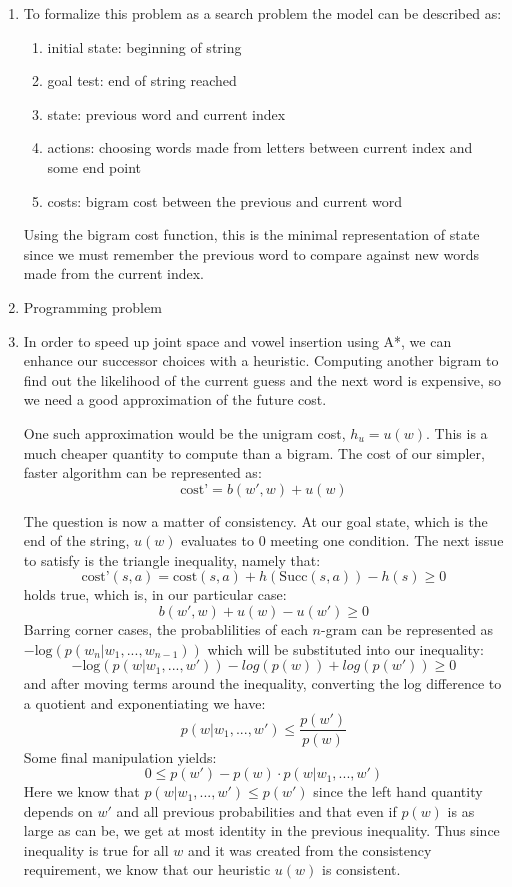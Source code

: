 \documentclass[12pt]{article}
\begin{document}
\begin{enumerate}[label=(\alph*)]
	\item To formalize this problem as a search problem the model can be
		described as:

		\begin{enumerate}
			\item initial state: beginning of string
			\item goal test: end of string reached
			\item state: previous word and current index
			\item actions: choosing words made from letters between current index and some
				end point
			\item costs: bigram cost between the previous and current word
		\end{enumerate}

		Using the bigram cost function, this is the minimal representation of state
		since we must remember the previous word to compare against new words made
		from the current index.
	
	\item Programming problem

	\item In order to speed up joint space and vowel insertion using A*,
		we can enhance our successor choices with a heuristic. Computing
		another bigram to find out the likelihood of the current guess
		and the next word is expensive, so we need a good approximation
		of the future cost.

		One such approximation would be the unigram cost, \(h_u = u(w)\). This
		is a much cheaper quantity to compute than a bigram. The cost of
		our simpler, faster algorithm can be represented as:
		\[
			\text{cost'} = b(w',w) + u(w)
		\]

		The question is now a matter of consistency. At our goal state,
		which is the end of the string, \(u(w)\) evaluates to \(0\)
		meeting one condition. The next issue to satisfy is the triangle
		inequality, namely that:
		\[
			\text{cost'}(s,a) = \text{cost}(s,a) + h(\text{Succ}(s,a)) - h(s) \geq 0
		\]
		holds true, which is, in our particular case:
		\[
			b(w',w) + u(w) - u(w') \geq 0
		\]
		Barring corner cases, the probablilities of each \(n\)-gram can be represented
		as \(-\text{log}(p(w_n | w_1,...,w_{n-1}))\) which will be substituted into
		our inequality:
		\[
			-\text{log}(p(w | w_1,...,w')) - log(p(w)) + log(p(w')) \geq 0
		\]
		and after moving terms around the inequality, converting the log difference
		to a quotient and exponentiating we have:
		\[
			p(w | w_1,...,w') \leq \frac{p(w')}{p(w)}
		\]
		Some final manipulation yields:
		\[
			 0 \leq p(w') - p(w) \cdot p(w | w_1,...,w')
		\]
		Here we know that \(p(w | w_1,...,w') \leq p(w')\) since the left hand
		quantity depends on \(w'\) and all previous probabilities and that
		even if \(p(w)\) is as large as can be, we get at most identity in the
		previous inequality. Thus since inequality is true for all \(w\)
		and it was created from the consistency requirement, we know that
		our heuristic \(u(w)\) is consistent.


\end{enumerate}
\end{document}
